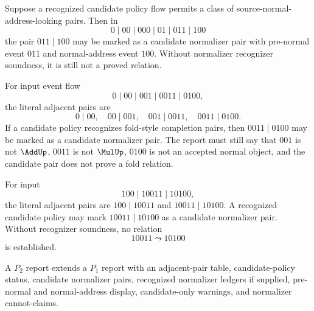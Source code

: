 \begin{example}
\label{ex:source-normalizer-carry-policy}
Suppose a recognized candidate policy flow permits a class of source-normal-address-looking pairs. Then in
$$
  0\mid 00\mid 000\mid 01\mid 011\mid 100
$$
the pair $011\mid 100$ may be marked as a candidate normalizer pair with pre-normal event $011$ and normal-address event $100$. Without normalizer recognizer soundness, it is still not a proved relation.
\end{example}

\begin{example}
\label{ex:source-normalizer-add-fold-candidate}
For input event flow
$$
  0\mid 00\mid 001\mid 0011\mid 0100,
$$
the literal adjacent pairs are
$$
  0\mid 00,\quad
  00\mid 001,\quad
  001\mid 0011,\quad
  0011\mid 0100.
$$
If a candidate policy recognizes fold-style completion pairs, then $0011\mid 0100$ may be marked as a candidate normalizer pair. The report must still say that $001$ is not $\AddUp$, $0011$ is not $\MulUp$, $0100$ is not an accepted normal object, and the candidate pair does not prove a fold relation.
\end{example}

\begin{example}
\label{ex:source-normalizer-higher-carry-candidate}
For input
$$
  100\mid 10011\mid 10100,
$$
the literal adjacent pairs are $100\mid 10011$ and $10011\mid 10100$. A recognized candidate policy may mark $10011\mid 10100$ as a candidate normalizer pair. Without recognizer soundness, no relation
$$
  10011\leadsto 10100
$$
is established.
\end{example}

\begin{definition}[$P_2$ report]
\label{def:source-normalizer-p2-report-format}
A $P_2$ report extends a $P_1$ report with an adjacent-pair table, candidate-policy status, candidate normalizer pairs, recognized normalizer ledgers if supplied, pre-normal and normal-address display, candidate-only warnings, and normalizer cannot-claims.
\end{definition}

